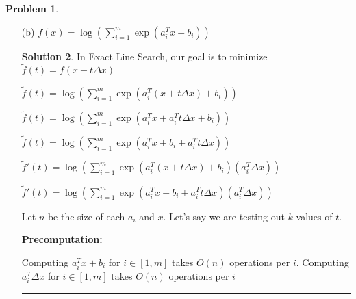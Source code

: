 \documentclass{article}
\theoremstyle{definition}
\newtheorem{problem}{Problem}
\def\fline{\rule{0.75\linewidth}{0.5pt}}
\newcommand{\finishline}{\begin{center}\fline\end{center}}
\newtheorem*{solution*}{Solution}
\newenvironment{solution}{\begin{solution*}}{{\finishline} \end{solution*}}
\begin{document}
\begin{problem}
\begin{enumerate}
\begin{solution}
Since we are testing out $k$ values of $t$, the Line Search Algorithm will be $O(mk)$ \newline 
Including pre-computation, it takes $O(mk) + O(mn)$ \newline 

\textbf{\underline{Cost with Precomputation($\tilde{f}'(t)$):}} \newline 
Computing $\frac{- a_i^T \Delta x}{\log{(b_i - a_i^Tx - a_i^T t \Delta x))}}$ takes $O(1)$ operations.

$\sum_{i=1}^{m} \frac{- a_i^T \Delta x}{\log{(b_i - a_i^Tx - a_i^T t \Delta x))}}$ takes $O(m)$ operations. 

$- \sum_{i=1}^{m} \frac{- a_i^T \Delta x}{\log{(b_i - a_i^Tx - a_i^T t \Delta x))}}$ takes $O(m)$ operations. 


Since we are testing out $k$ values of $t$, the Line Search Algorithm will be $O(mk)$ \newline 
Including pre-computation, it takes $O(mk) + O(mn)$ \newline 

    \end{solution}
 
    \item[(b)] $f(x) = \log(\sum_{i=1}^{m} \exp(a_i^Tx + b_i))$ 

    \begin{solution}
         In Exact Line Search, our goal is to minimize $\tilde{f}(t) =  f(x + t\Delta x)$

         $\tilde{f}(t) =  \log(\sum_{i=1}^{m} \exp(a_i^T(x + t\Delta x) + b_i))$ \newline 

         $\tilde{f}(t) =  \log(\sum_{i=1}^{m} \exp(a_i^Tx + a_i^T t\Delta x + b_i))$

        $\tilde{f}(t) =  \log(\sum_{i=1}^{m} \exp(a_i^Tx + b_i + a_i^T t\Delta x))$


        $\tilde{f}'(t) =  \log(\sum_{i=1}^{m} \exp(a_i^T(x + t\Delta x) + b_i) (a_i^T \Delta x))$

        
        $\tilde{f}'(t) =  \log(\sum_{i=1}^{m} \exp(a_i^Tx + b_i + a_i^T t\Delta x) (a_i^T \Delta x))$

        Let $n$ be the size of each $a_i$ and $x$. Let's say we are testing out $k$ values of $t$. 

        \textbf{\underline{Precomputation:}} \newline  
        
        Computing $a_i^Tx + b_i$ for $i \in [1, m]$ takes $O(n)$ operations per $i$. \newline 
        Computing $a_i^T \Delta x$ for $i \in [1, m]$ takes $O(n)$ operations per $i$


\end{solution}
\end{enumerate}
\end{problem}
\end{document}
